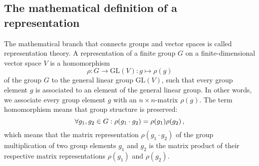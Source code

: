 \subsection{The mathematical definition of a representation}
     The mathematical branch that connects groups and vector spaces is called representation theory. A representation of a finite group $G$ on a finite-dimensional vector space $V$ is a homomorphism
     \begin{equation}
        \rho: G \rightarrow \text{GL}(V): g \mapsto \rho(g)
     \end{equation}
     of the group $G$ to the general linear group $\text{GL}(V)$, such that every group element $g$ is associated to an element of the general linear group. In other words, we associate every group element $g$ with an $n \times n$-matrix $\rho(g)$. The term homomorphism means that group structure is preserved:
     \begin{equation}
       \forall g_1, g_2 \in G: \rho(g_1 \cdot g_2) = \rho(g_1) \rho(g_2) \thinspace ,
     \end{equation}
     which means that the matrix representation $\rho(g_1 \cdot g_2)$ of the group multiplication of two group elements $g_1$ and $g_2$ is the matrix product of their respective matrix representations $\rho(g_1)$ and $\rho(g_2)$.
